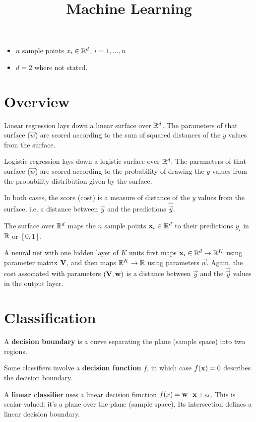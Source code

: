 \documentclass[12pt]{article}
\title{Machine Learning}
\begin{document}
\maketitle

\begin{itemize}
\item $n$ sample points $x_i \in \mathbb{R}^d$, $i = 1, \ldots, n$
\item $d = 2$ where not stated.
\end{itemize}

\section*{Overview}

Linear regression lays down a linear surface over $\mathbb{R}^d$. The parameters of
that surface ($\vec w$) are scored according to the sum of squared distances of
the $y$ values from the surface.

Logistic regression lays down a logistic surface over $\mathbb{R}^d$. The parameters of
that surface ($\vec w$) are scored according to the probability of drawing the
$y$ values from the probability distribution given by the surface.

In both cases, the score (cost) is a measure of distance of the $y$ values from
the surface, i.e. a distance between $\vec y$ and the predictions
$\hat{\vec y}$.

The surface over $\mathbb{R}^d$ maps the $n$ sample points $\mathbf x_i \in \mathbb{R}^d$ to their
predictions $y_i$ in $\mathbb{R}$ or $[0, 1]$.

A neural net with one hidden layer of $K$ units first maps
$\mathbf x_i \in \mathbb{R}^d \to \mathbb{R}^K$ using parameter matrix $\mathbf V$, and then maps
$\mathbb{R}^K \to \mathbb{R}$ using parameters $\vec w$. Again, the cost associated with
parameters $(\mathbf V, \mathbf w)$ is a distance between $\vec y$ and the
$\hat{\vec y}$ values in the output layer.

\section*{Classification}

A \textbf{decision boundary} is a curve separating the plane (sample space)
into two regions.

Some classifiers involve a \textbf{decision function} $f$, in which case
$f(\mathbf x) = 0$ describes the decision boundary.

A \textbf{linear classifier} uses a linear decision function
$f(x) = \mathbf w \cdot \mathbf x + \alpha$. This is scalar-valued: it's a plane over
the plane (sample space). Its intersection defines a linear decision boundary.
\end{document}
